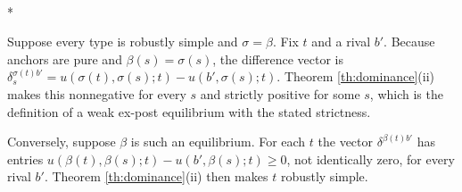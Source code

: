 \documentclass[12pt]{article}
\makeatletter
\theoremstyle{definition}
\renewenvironment{proof}[1][\proofname]{\par
  \pushQED{\qed}%
  \normalfont \topsep6\p@\@plus6\p@\relax
  \trivlist
  \item[\hskip\labelsep\itshape #1\@addpunct{.}]\mbox{}\\*
  \ignorespaces
}{%
  \popQED\endtrivlist\@endpefalse
}
\makeatother
\begin{document}
\begin{proof}[Proof of Corollary \ref{cor:expost}]
Suppose every type is robustly simple and $\sigma = \beta$. Fix $t$ and a rival $b'$. Because anchors are pure and $\beta(s) = \sigma(s)$, the difference vector is $\delta^{\sigma(t) b'}_s = u(\sigma(t), \sigma(s); t) - u(b', \sigma(s); t)$. Theorem \ref{th:dominance}(ii) makes this nonnegative for every $s$ and strictly positive for some $s$, which is the definition of a weak ex-post equilibrium with the stated strictness.

Conversely, suppose $\beta$ is such an equilibrium. For each $t$ the vector $\delta^{\beta(t) b'}$ has entries $u(\beta(t), \beta(s); t) - u(b', \beta(s); t) \ge 0$, not identically zero, for every rival $b'$. Theorem \ref{th:dominance}(ii) then makes $t$ robustly simple.
\end{proof}
\end{document}
